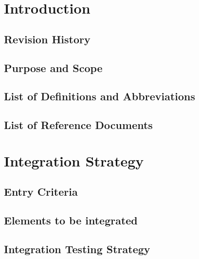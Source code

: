 \documentclass[12pt, a4paper]{article}
\title{
	\Huge{\textbf{\centerline{myTaxiService}}}
	\newline
	\huge{\textbf{I}ntegration \textbf{T}est \textbf{P}lan}
}
\author{
	Monica Magoni 854091
	\\
	Alberto Cibari 852689
}
\date{\today}
\begin{document}
	\maketitle
	\newpage
	\renewcommand*\contentsname{\Huge{Contents}}
	\tableofcontents
	
	\newpage
    \section{Introduction}
    	\subsection{Revision History}
    	
    	
    	\subsection{Purpose and Scope}
    	
    	
    	\subsection{List of Definitions and Abbreviations}
    	
    	
    	\subsection{List of Reference Documents}
    	
    	
    \newpage
    \section{Integration Strategy}
        \subsection{Entry Criteria}
    	
        
        \subsection{Elements to be integrated}
    	
    	
    	\subsection{Integration Testing Strategy}
    	
    	
\end{document}
